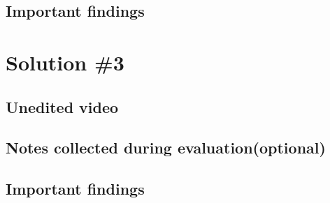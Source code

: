 \documentclass[a4paper,10pt,oneside]{scrreprt}
\begin{document}
\subsection{Important findings}

\section{Solution \#3}
\subsection{Unedited video}

\subsection{Notes collected during evaluation(optional)}

\subsection{Important findings}
\end{document}
